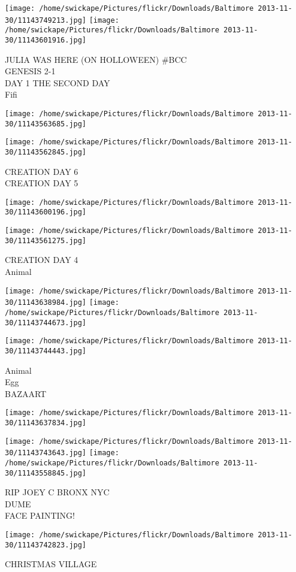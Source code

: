 \documentclass[10pt,letterpaper]{article}
\begin{document}
\texttt{[image: /home/swickape/Pictures/flickr/Downloads/Baltimore 2013-11-30/11143749213.jpg]}
\texttt{[image: /home/swickape/Pictures/flickr/Downloads/Baltimore 2013-11-30/11143601916.jpg]}

JULIA WAS HERE (ON HOLLOWEEN) \#BCC\\
GENESIS 2{-}1\\
DAY 1 THE SECOND DAY\\
Fifi
\pagebreak

\texttt{[image: /home/swickape/Pictures/flickr/Downloads/Baltimore 2013-11-30/11143563685.jpg]}

\vspace{0.25in}
\texttt{[image: /home/swickape/Pictures/flickr/Downloads/Baltimore 2013-11-30/11143562845.jpg]}

CREATION DAY 6\\
CREATION DAY 5
\pagebreak

\texttt{[image: /home/swickape/Pictures/flickr/Downloads/Baltimore 2013-11-30/11143600196.jpg]}

\vspace{0.25in}
\texttt{[image: /home/swickape/Pictures/flickr/Downloads/Baltimore 2013-11-30/11143561275.jpg]}

CREATION DAY 4\\
Animal
\pagebreak

\texttt{[image: /home/swickape/Pictures/flickr/Downloads/Baltimore 2013-11-30/11143638984.jpg]}
\texttt{[image: /home/swickape/Pictures/flickr/Downloads/Baltimore 2013-11-30/11143744673.jpg]}

\vspace{0.25in}
\texttt{[image: /home/swickape/Pictures/flickr/Downloads/Baltimore 2013-11-30/11143744443.jpg]}

Animal\\
Egg\\
BAZAART
\pagebreak

\texttt{[image: /home/swickape/Pictures/flickr/Downloads/Baltimore 2013-11-30/11143637834.jpg]}

\vspace{0.25in}
\texttt{[image: /home/swickape/Pictures/flickr/Downloads/Baltimore 2013-11-30/11143743643.jpg]}
\texttt{[image: /home/swickape/Pictures/flickr/Downloads/Baltimore 2013-11-30/11143558845.jpg]}

RIP JOEY C BRONX NYC\\
DUME\\
FACE PAINTING!
\pagebreak

\texttt{[image: /home/swickape/Pictures/flickr/Downloads/Baltimore 2013-11-30/11143742823.jpg]}

CHRISTMAS VILLAGE
\pagebreak
\end{document}
